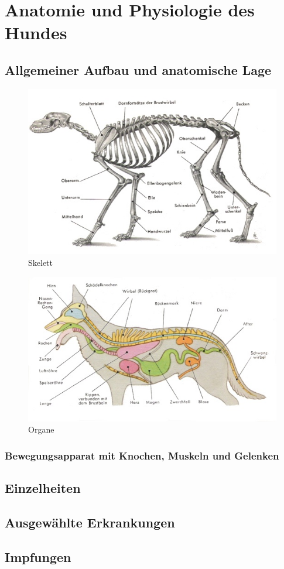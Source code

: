 \chapter{Anatomie und Physiologie des Hundes}


\section{Allgemeiner Aufbau und anatomische Lage}
        \begin{figure}[ht]
        \centering
        \includegraphics[width=1.0\textwidth]{./bilder/anatomie1.jpg}
        \caption{Skelett \label{overflow}}
        \end{figure}

        \begin{figure}[ht]
        \centering
        \includegraphics[width=1.0\textwidth]{./bilder/anatomie2.jpg}
        \caption{Organe \label{overflow}}
        \end{figure}

    \subsection{Bewegungsapparat mit Knochen, Muskeln und Gelenken}


\section{Einzelheiten}

\section{Ausgewählte Erkrankungen}

\section{Impfungen}